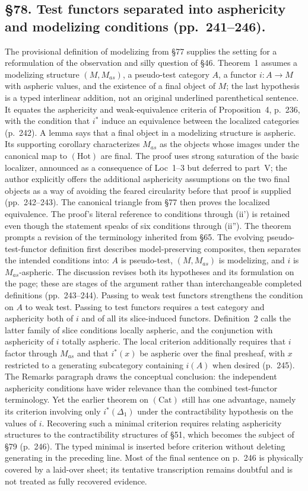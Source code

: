 \documentclass[10pt,oneside]{book}
\begin{document}
\subsection*{\S78. Test functors separated into asphericity and modelizing conditions (pp.\ 241--246).}
The provisional definition of modelizing from \S77 supplies the setting for a reformulation of the observation and silly question of \S46. Theorem~1 assumes a modelizing structure $(M,M_{as})$, a pseudo-test category $A$, a functor $i:A\to M$ with aspheric values, and the existence of a final object of $M$; the last hypothesis is a typed interlinear addition, not an original underlined parenthetical sentence. It equates the asphericity and weak-equivalence criteria of Proposition~4, p.\ 236, with the condition that $i^*$ induce an equivalence between the localized categories (p.\ 242). A lemma says that a final object in a modelizing structure is aspheric. Its supporting corollary characterizes $M_{as}$ as the objects whose images under the canonical map to $(\mathrm{Hot})$ are final. The proof uses strong saturation of the basic localizer, announced as a consequence of Loc~1--3 but deferred to part~V; the author explicitly offers the additional asphericity assumptions on the two final objects as a way of avoiding the feared circularity before that proof is supplied (pp.\ 242--243). The canonical triangle from \S77 then proves the localized equivalence. The proof's literal reference to conditions through (ii') is retained even though the statement speaks of six conditions through (ii''). The theorem prompts a revision of the terminology inherited from \S65. The evolving pseudo-test-functor definition first describes model-preserving composites, then separates the intended conditions into: $A$ is pseudo-test, $(M,M_{as})$ is modelizing, and $i$ is $M_{as}$-aspheric. The discussion revises both its hypotheses and its formulation on the page; these are stages of the argument rather than interchangeable completed definitions (pp.\ 243--244). Passing to weak test functors strengthens the condition on $A$ to weak test. Passing to test functors requires a test category and asphericity both of $i$ and of all its slice-induced functors. Definition~2 calls the latter family of slice conditions locally aspheric, and the conjunction with asphericity of $i$ totally aspheric. The local criterion additionally requires that $i$ factor through $M_{as}$ and that $i^*(x)$ be aspheric over the final presheaf, with $x$ restricted to a generating subcategory containing $i(A)$ when desired (p.\ 245). The Remarks paragraph draws the conceptual conclusion: the independent asphericity conditions have wider relevance than the combined test-functor terminology. Yet the earlier theorem on $(\mathrm{Cat})$ still has one advantage, namely its criterion involving only $i^*(\Delta_1)$ under the contractibility hypothesis on the values of $i$. Recovering such a minimal criterion requires relating asphericity structures to the contractibility structures of \S51, which becomes the subject of \S79 (p.\ 246). The typed minimal is inserted before criterion without deleting generating in the preceding line. Most of the final sentence on p.\ 246 is physically covered by a laid-over sheet; its tentative transcription remains doubtful and is not treated as fully recovered evidence.
\end{document}
